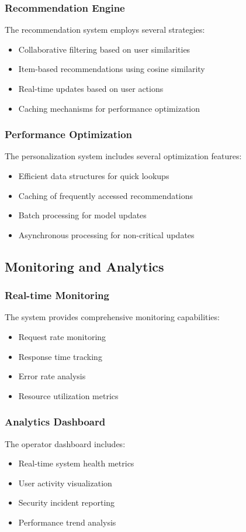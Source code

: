 \documentclass[12pt]{article}
\begin{document}
\subsubsection{Recommendation Engine}
The recommendation system employs several strategies:
\begin{itemize}
    \item Collaborative filtering based on user similarities
    \item Item-based recommendations using cosine similarity
    \item Real-time updates based on user actions
    \item Caching mechanisms for performance optimization
\end{itemize}

\subsubsection{Performance Optimization}
The personalization system includes several optimization features:
\begin{itemize}
    \item Efficient data structures for quick lookups
    \item Caching of frequently accessed recommendations
    \item Batch processing for model updates
    \item Asynchronous processing for non-critical updates
\end{itemize}

\subsection{Monitoring and Analytics}
\subsubsection{Real-time Monitoring}
The system provides comprehensive monitoring capabilities:
\begin{itemize}
    \item Request rate monitoring
    \item Response time tracking
    \item Error rate analysis
    \item Resource utilization metrics
\end{itemize}

\subsubsection{Analytics Dashboard}
The operator dashboard includes:
\begin{itemize}
    \item Real-time system health metrics
    \item User activity visualization
    \item Security incident reporting
    \item Performance trend analysis
\end{itemize}
\end{document}
